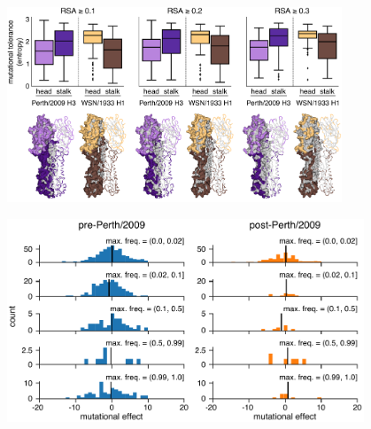 \documentclass[9pt,twocolumn,twoside]{pnas-new-for-biorxiv}
\begin{document}
\begin{suppfigure}[H]
\centerline{\includegraphics[width=0.75\textwidth]{figs/supp_head_stalk_RSA/head_stalk_RSA.pdf}}
\caption{\label{suppfig:head_stalk_RSA}
{\bf Mutational tolerances of the head and stalk domains at various relative solvent accessibility cutoffs.}
The mutational tolerances of the head and stalk domains show less disparity for the Perth/2009 H3 HA compared to those for the WSN/1933 H1 HA.
We used relative solvent accessibility (RSA) cutoffs of $0.1$, $0.2$, and $0.3$ to define solvent-exposed residues and plotted the mutational tolerances (Shannon entropy of re-scaled preferences) of these residues in the head and stalk domains for the Perth/2009 H3 HA (purple) and the WSN/1933 H1 HA (brown).
Residues falling in between the two cysteines at sites 52 and 277 were defined as belonging to the head domain, while all other residues were defined as the stalk domain.
The HA structures color the residues that are defined as solvent exposed at a given RSA cutoff.
One monomer is shown in surface representation and another monomer shown in ribbon representation.
Residues in lighter shades of purple or brown are in the head domain, while residues in darker shades are in the stalk domain.
Note that the mutational tolerance values are not comparable between the two HAs.
}
\end{suppfigure}

\begin{suppfigure}[H]
\centerline{\includegraphics[width=0.8\textwidth]{figs/supp_muteffect_maxfreq_WSN/muteffect_maxfreq_WSN_supp.pdf}}
\caption{\label{suppfig:muteffect_maxfreq_WSN_supp}
{\bf The distribution of mutational effects measured in H1 HA among H3N2 mutations binned by the maximum frequency that they reach.}
This figure repeats the analysis of the H3N2 mutation frequencies in Figure~\ref{fig:muteffect_maxfreq}B, but uses the deep mutational scanning data for an H1 HA as measured in \cite{doud2016accurate}.
}
\end{suppfigure}
\end{document}
